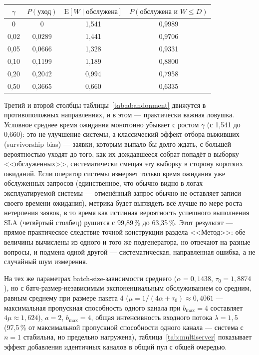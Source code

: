 \documentclass[12pt,a4paper]{article}
\newcommand{\articlesection}[1]{\par\vspace{14pt}{\bfseries #1}\par\vspace{6pt}\nopagebreak}
\begin{document}
\begin{center}
\label{tab:abandonment}
\begin{tabular}{|c|c|c|c|}
\hline
$\gamma$ & $P(\text{уход})$ & $\mathrm{E}[W\mid\text{обслужена}]$ & $P(\text{обслужена и }W\le D)$ \\
\hline
0     & 0       & 1,541 & 0,9989 \\
0,02  & 0,0289 & 1,441 & 0,9706 \\
0,05  & 0,0666 & 1,328 & 0,9331 \\
0,10  & 0,1199 & 1,189 & 0,8800 \\
0,20  & 0,2042 & 0,994 & 0,7958 \\
0,50  & 0,3665 & 0,660 & 0,6335 \\
\hline
\end{tabular}
\end{center}

Третий и второй столбцы таблицы~\ref{tab:abandonment} движутся в противоположных направлениях, и в этом --- практически важная ловушка. Условное среднее время ожидания монотонно убывает с ростом $\gamma$ (с 1,541 до 0,660): это не улучшение системы, а классический эффект отбора выживших (survivorship bias) --- заявки, которым выпало бы долго ждать, с большей вероятностью уходят до того, как их дождавшееся собрат попадёт в выборку <<обслуженных>>, систематически смещая эту выборку в сторону коротких ожиданий. Если оператор системы измеряет только время ожидания уже обслуженных запросов (единственное, что обычно видно в логах эксплуатируемой системы --- отменённый запрос обычно не оставляет записи своего времени ожидания), метрика будет выглядеть всё лучше по мере роста нетерпения заявок, в то время как истинная вероятность успешного выполнения SLA (четвёртый столбец) рушится с 99,89\,\% до 63,35\,\%. Этот результат --- прямое практическое следствие точной конструкции раздела <<Метод>>: обе величины вычислены из одного и того же подгенератора, но отвечают на разные вопросы, и подмена одной другой --- систематическая, направленная ошибка, а не случайный шум измерения.

\articlesection{Расширение 2: несколько каналов обслуживания}

На тех же параметрах batch-size-зависимости среднего ($\alpha=0{,}1438$, $\tau_0=1{,}8874$), но с батч-размер-независимым экспоненциальным обслуживанием со средним, равным среднему при размере пакета 4 ($\mu=1/(4\alpha+\tau_0)\approx0{,}4061$ --- максимальная пропускная способность одного канала при $b_{\max}=4$ составляет $4\mu\approx1{,}624$), $a=2$, $b_{\max}=4$, общая интенсивность входного потока $\lambda=1{,}5$ (97,5\,\% от максимальной пропускной способности одного канала --- система с $n=1$ стабильна, но предельно нагружена), таблица~\ref{tab:multiserver} показывает эффект добавления идентичных каналов в общий пул с общей очередью.
\end{document}
